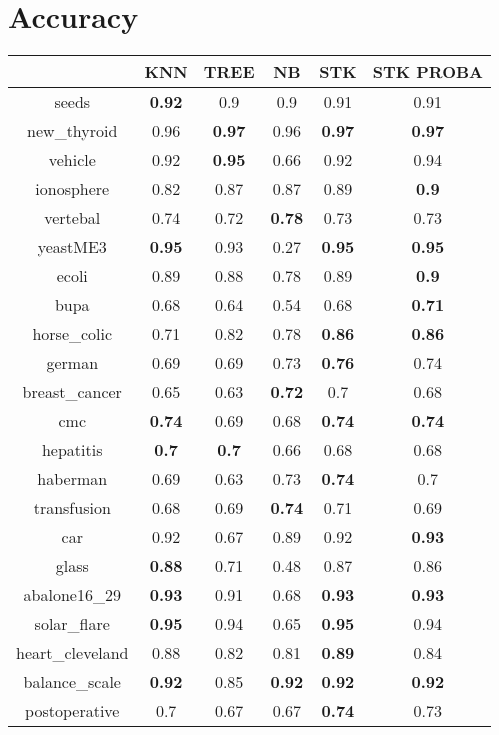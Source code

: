 \documentclass{article}%
\begin{document}
%
\normalsize%
\section*{Accuracy}%
\begin{tabular}{c|ccccc}%
&KNN&TREE&NB&STK&STK PROBA\\%
\hline%
seeds&\textbf{0.92}&0.9&0.9&0.91&0.91\\%
new\_thyroid&0.96&\textbf{0.97}&0.96&\textbf{0.97}&\textbf{0.97}\\%
vehicle&0.92&\textbf{0.95}&0.66&0.92&0.94\\%
ionosphere&0.82&0.87&0.87&0.89&\textbf{0.9}\\%
vertebal&0.74&0.72&\textbf{0.78}&0.73&0.73\\%
yeastME3&\textbf{0.95}&0.93&0.27&\textbf{0.95}&\textbf{0.95}\\%
ecoli&0.89&0.88&0.78&0.89&\textbf{0.9}\\%
bupa&0.68&0.64&0.54&0.68&\textbf{0.71}\\%
horse\_colic&0.71&0.82&0.78&\textbf{0.86}&\textbf{0.86}\\%
german&0.69&0.69&0.73&\textbf{0.76}&0.74\\%
breast\_cancer&0.65&0.63&\textbf{0.72}&0.7&0.68\\%
cmc&\textbf{0.74}&0.69&0.68&\textbf{0.74}&\textbf{0.74}\\%
hepatitis&\textbf{0.7}&\textbf{0.7}&0.66&0.68&0.68\\%
haberman&0.69&0.63&0.73&\textbf{0.74}&0.7\\%
transfusion&0.68&0.69&\textbf{0.74}&0.71&0.69\\%
car&0.92&0.67&0.89&0.92&\textbf{0.93}\\%
glass&\textbf{0.88}&0.71&0.48&0.87&0.86\\%
abalone16\_29&\textbf{0.93}&0.91&0.68&\textbf{0.93}&\textbf{0.93}\\%
solar\_flare&\textbf{0.95}&0.94&0.65&\textbf{0.95}&0.94\\%
heart\_cleveland&0.88&0.82&0.81&\textbf{0.89}&0.84\\%
balance\_scale&\textbf{0.92}&0.85&\textbf{0.92}&\textbf{0.92}&\textbf{0.92}\\%
postoperative&0.7&0.67&0.67&\textbf{0.74}&0.73\\%
\end{tabular}

%
\end{document}

